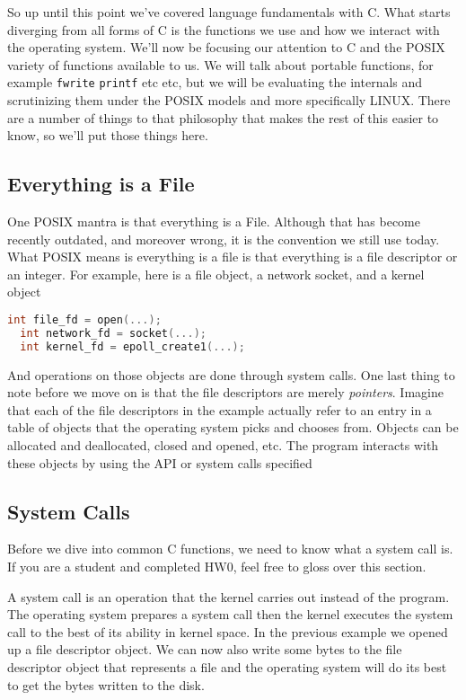 So up until this point we've covered language fundamentals with C.
What starts diverging from all forms of C is the functions we use and how we interact with the operating system.
We'll now be focusing our attention to C and the POSIX variety of functions available to us.
We will talk about portable functions, for example \texttt{fwrite} \texttt{printf} etc etc, but we will be evaluating the internals and scrutinizing them under the POSIX models and more specifically LINUX. There are a number of things to that philosophy that makes the rest of this easier to know, so we'll put those things here.

\subsection{Everything is a File}

One POSIX mantra is that everything is a File.
Although that has become recently outdated, and moreover wrong, it is the convention we still use today.
What POSIX means is everything is a file is that everything is a file descriptor or an integer. For example, here is a file object, a network socket, and a kernel object

\begin{lstlisting}[language=C]
  int file_fd = open(...);
  int network_fd = socket(...);
  int kernel_fd = epoll_create1(...);
\end{lstlisting}

And operations on those objects are done through system calls.
One last thing to note before we move on is that the file descriptors are merely \textit{pointers}.
Imagine that each of the file descriptors in the example actually refer to an entry in a table of objects that the operating system picks and chooses from.
Objects can be allocated and deallocated, closed and opened, etc.
The program interacts with these objects by using the API or system calls specified

\subsection{System Calls}

Before we dive into common C functions, we need to know what a system call is.
If you are a student and completed HW0, feel free to gloss over this section.

A system call is an operation that the kernel carries out instead of the program.
The operating system prepares a system call then the kernel executes the system call to the best of its ability in kernel space.
In the previous example we opened up a file descriptor object.
We can now also write some bytes to the file descriptor object that represents a file and the operating system will do its best to get the bytes written to the disk.

